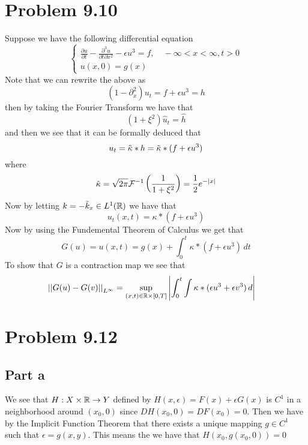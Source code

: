 \documentclass[12pt]{report}
\newcommand{\norm}[1]{\left|\left|#1\right|\right|}
\begin{document}
\section*{Problem 9.10}
Suppose we have the following differential equation
\begin{equation*}
  \begin{cases}
    \frac{\partial u}{\partial t} - \frac{\partial^3 u}{\partial t \partial x^2} - \epsilon u^3 = f, \quad -\infty < x < \infty, t > 0\\
    u(x,0) = g(x)
  \end{cases}
\end{equation*}
Note that we can rewrite the above as
\begin{equation*}
(1 - \partial_{x}^2)u_t = f + \epsilon u^3 = h
\end{equation*}
then by taking the Fourier Transform we have that
\begin{equation*}
  (1 + \xi^2) \hat{u}_t = \hat{h} 
\end{equation*}
and then we see that it can be formally deduced that  
\begin{equation*}
  u_t = \Tilde{\kappa} * h = \Tilde{\kappa} * (f + \epsilon u^3)
\end{equation*}
where 
\begin{equation*}
  \Tilde{\kappa} = \sqrt{2\pi} \mathcal{F}^{-1}\left(\frac{1}{1+\xi^2}\right) = \frac{1}{2}e^{-|x|}
\end{equation*}
Now by letting $k = -\Tilde{k}_x \in L^1(\mathbb{R})$ we have that 
\begin{equation*}
  u_t(x,t) = \kappa * (f + \epsilon u^3)  
\end{equation*}
Now by using the Fundemental Theorem of Calculus we get that
\begin{equation*}
  G(u) = u(x,t) = g(x) + \int_0^t \kappa * (f + \epsilon u^3) \, dt
\end{equation*}
To show that $G$ is a contraction map we see that
\begin{align*}
  \norm{G(u) - G(v)}_{L^\infty} &= \sup_{(x,t) \in \R \times [0,T]} \left|\int_0^t \int \kappa * (\epsilon u^3 + \epsilon v^3) \, d\right| 
\end{align*}
\section*{Problem 9.12}
\subsection*{Part a}
We see that $H: X \times \mathbb{R} \to Y$ defined by $H(x,\epsilon) = F(x) + \epsilon G(x)$ is $C^1$ in a neighborhood around $(x_0,0)$ since $DH(x_0,0) = DF(x_0) = 0$. Then we have by the Implicit Function Theorem that there exists a 
unique mapping $g \in C^1$ such that $\epsilon = g(x,y)$. This means the we have that $H(x_0, g(x_0,0)) = 0$ 
\end{document}
